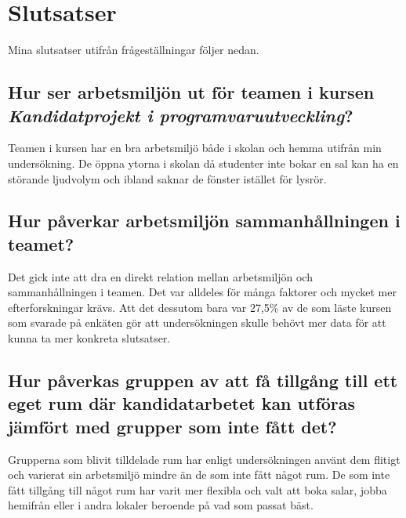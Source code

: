 \section{Slutsatser}
\label{sec:conclusions-hampus}

Mina slutsatser utifrån frågeställningar följer nedan.

\subsection{Hur ser arbetsmiljön ut för teamen i kursen \textit{Kandidatprojekt i programvaruutveckling}?}
Teamen i kursen har en bra arbetsmiljö både i skolan och hemma utifrån min undersökning. De öppna ytorna i skolan då studenter inte bokar en sal kan ha en störande ljudvolym och ibland saknar de fönster istället för lysrör. 

\subsection{Hur påverkar arbetsmiljön sammanhållningen i teamet?}
Det gick inte att dra en direkt relation mellan arbetsmiljön och sammanhållningen i teamen. Det var alldeles för många faktorer och mycket mer efterforskningar krävs. Att det dessutom bara var 27,5\% av de som läste kursen som svarade på enkäten gör att undersökningen skulle behövt mer data för att kunna ta mer konkreta slutsatser.

\subsection{Hur påverkas gruppen av att få tillgång till ett eget rum där kandidatarbetet kan utföras jämfört med grupper som inte fått det?}
Grupperna som blivit tilldelade rum har enligt undersökningen använt dem flitigt och varierat sin arbetsmiljö mindre än de som inte fått något rum. De som inte fått tillgång till något rum har varit mer flexibla och valt att boka salar, jobba hemifrån eller i andra lokaler beroende på vad som passat bäst.


